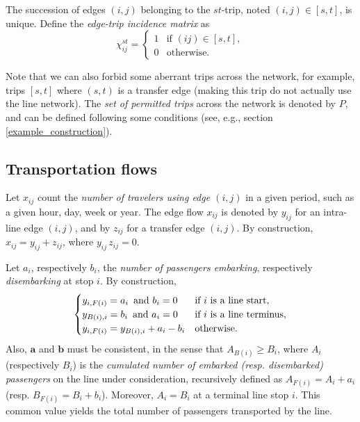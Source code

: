 \documentclass{bmcart}
\begin{document}
The succession of edges $(i, j)$ belonging to the $st$-trip, noted $(i,j)\in [s,t]$, is unique. Define the \emph{edge-trip incidence matrix} as
\begin{equation}
\label{edgetrip}
\chi_{ij}^{st} = \begin{cases}
  1    & \text{if $(ij)\in [s,t]$}, \\
  0    & \text{otherwise}.
\end{cases}
\end{equation}

Note that we can also forbid some aberrant trips across the network, for example, trips $[s, t]$ where $(s, t)$ is a transfer edge (making this trip do not actually use the line network). The \emph{set of permitted trips} across the network is denoted by $P$, and can be defined following some conditions (see, e.g., section \ref{example_construction}).

\vspace*{0.1cm}

\subsection{Transportation flows}
\label{Transportation flows}
Let  $x_{ij}$ count the \emph{number of travelers using edge $(i,j)$} in a given period, such as a given hour, day, week or  year.  The edge flow $x_{ij}$ is denoted by $y_{ij}$ for an intra-line edge $(i,j)$, and 
by $z_{ij}$ for a transfer edge $(i,j)$. By construction, $x_{ij}=y_{ij}+z_{ij}$, where $y_{ij}\,  z_{ij}=0$. 

\vspace*{0.1cm}


Let $a_i$, respectively $b_i$, the \emph{number of passengers embarking}, respectively \emph{disembarking} at stop $i$. By construction, 
\begin{equation}
\label{bilan1ligne}
\begin{cases}
 y_{i,F(i)}=a_i \text{\,  and } b_i=0   & \text{if $i$ is a line start}, \\
y_{B(i),i}=b_i \text{\,  and } a_i=0   & \text{if $i$ is a line terminus}, \\
 y_{i,F(i)}=y_{B(i),i}+a_i-b_i     & \text{otherwise}.
\end{cases}
\end{equation}
Also, $\mathbf{a}$ and $\mathbf{b}$ must be consistent, in the sense that $A_{B(i)}\ge B_i$, where $A_i$ (respectively $B_i$) is the \emph{cumulated number of embarked 
(resp. disembarked) passengers} on the line under consideration, recursively defined as $A_{F(i)}=A_i+a_i$ (resp. $B_{F(i)}=B_i+b_i$). Moreover,  $A_i=B_i$ at a terminal line stop $i$. This common value yields  the total number of passengers transported by the line. 
\end{document}
